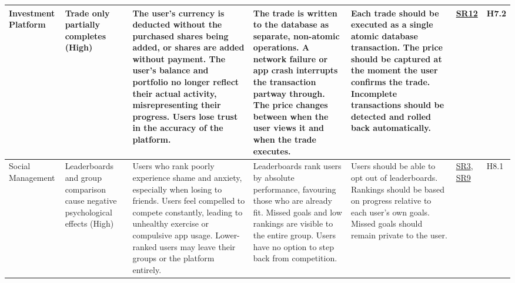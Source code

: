 \documentclass{article}
\begin{document}
\begin{landscape}
{\begin{longtable}{|p{2.5cm}|p{3cm}|p{3.8cm}|p{3.8cm}|p{5.5cm}|p{1.8cm}|p{1cm}|}
            \hline
            Investment Platform & Trade only partially completes (High) & \textbullet{} The user's currency is deducted without the purchased shares being added, or shares are added without payment. \newline \textbullet{} The user's balance and portfolio no longer reflect their actual activity, misrepresenting their progress. \newline \textbullet{} Users lose trust in the accuracy of the platform. & \textbullet{} The trade is written to the database as separate, non-atomic operations. \newline \textbullet{} A network failure or app crash interrupts the transaction partway through. \newline \textbullet{} The price changes between when the user views it and when the trade executes. & \textbullet{} Each trade should be executed as a single atomic database transaction. \newline \textbullet{} The price should be captured at the moment the user confirms the trade. \newline \textbullet{} Incomplete transactions should be detected and rolled back automatically. & \hyperlink{sr12}{SR12} & H7.2 \\
            \hline
            Social Management & Leaderboards and group comparison cause negative psychological effects (High) & \textbullet{} Users who rank poorly experience shame and anxiety, especially when losing to friends. \newline \textbullet{} Users feel compelled to compete constantly, leading to unhealthy exercise or compulsive app usage. \newline \textbullet{} Lower-ranked users may leave their groups or the platform entirely. & \textbullet{} Leaderboards rank users by absolute performance, favouring those who are already fit. \newline \textbullet{} Missed goals and low rankings are visible to the entire group. \newline \textbullet{} Users have no option to step back from competition. & \textbullet{} Users should be able to opt out of leaderboards. \newline \textbullet{} Rankings should be based on progress relative to each user's own goals. \newline \textbullet{} Missed goals should remain private to the user. & \hyperlink{sr3}{SR3}, \hyperlink{sr9}{SR9} & H8.1 \\
            \hline

\end{longtable}}
\end{landscape}
\end{document}
